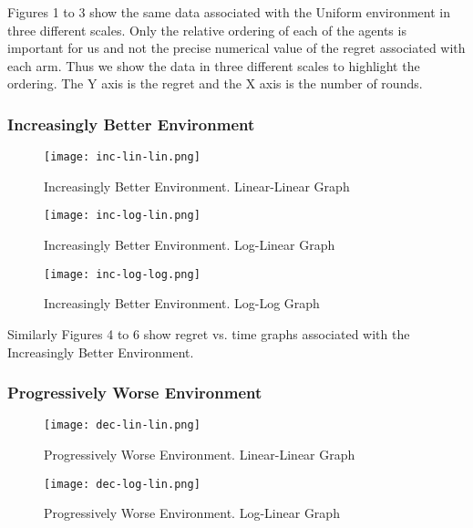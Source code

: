 Figures 1 to 3 show the same data associated with the Uniform environment in three different scales. Only the relative ordering of each of the agents is important for us and not the precise numerical value of the regret associated with each arm. Thus we show the data in three different scales to highlight the ordering. The Y axis is the regret and the X axis is the number of rounds.

\subsubsection{Increasingly Better Environment}

\begin{figure}[ht]
    \centering
    \texttt{[image: inc-lin-lin.png]}
    \caption{Increasingly Better Environment. Linear-Linear Graph}
    \label{fig:i1}
\end{figure}

\begin{figure}[ht]
    \centering
    \texttt{[image: inc-log-lin.png]}
    \caption{Increasingly Better Environment. Log-Linear Graph}
    \label{fig:i2}
\end{figure}

\begin{figure}[ht]
    \centering
    \texttt{[image: inc-log-log.png]}
    \caption{Increasingly Better Environment. Log-Log Graph}
    \label{fig:i3}
\end{figure}

Similarly Figures 4 to 6 show regret vs. time graphs associated with the Increasingly Better Environment. 

\subsubsection{Progressively Worse Environment}

\begin{figure}[ht]
    \centering
    \texttt{[image: dec-lin-lin.png]}
    \caption{Progressively Worse Environment. Linear-Linear Graph}
    \label{fig:d1}
\end{figure}

\begin{figure}[ht]
    \centering
    \texttt{[image: dec-log-lin.png]}
    \caption{Progressively Worse Environment. Log-Linear Graph}
    \label{fig:d2}
\end{figure}

